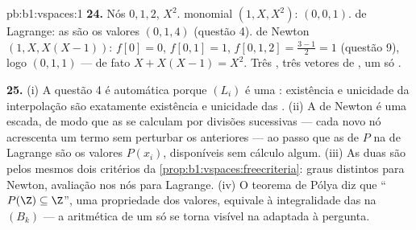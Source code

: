 \begin{solution}{pb:b1:vspaces:1}
\textbf{24.} Nós $0, 1, 2$,  $X^2$.  monomial
$(1, X, X^2)$:  $(0, 0, 1)$.  de Lagrange: as  são os
valores $(0, 1, 4)$ (questão 4).  de Newton $(1, X, X(X-1))$:  $f[0] = 0$, $f[0,1] = 1$, $f[0,1,2] = \frac{3 - 1}{2} = 1$ (questão 9), logo 
$(0, 1, 1)$ --- de fato $X + X(X-1) = X^2$. Três , três vetores de ,
um só .

\textbf{25.} (i) A questão 4 é automática porque $(L_i)$ é uma
\emph{}: existência e unicidade da interpolação são exatamente
existência e unicidade das . (ii) A  de Newton é uma
escada, de modo que as  se calculam por divisões
sucessivas --- cada novo nó acrescenta um termo sem perturbar os
anteriores --- ao passo que as  de $P$ na  de
Lagrange são os valores $P(x_i)$, disponíveis sem cálculo algum.
(iii) As duas  são  pelos mesmos dois critérios da
\cref{prop:b1:vspaces:freecriteria}: graus distintos para Newton, avaliação nos nós para
Lagrange. (iv) O teorema de Pólya diz que ``$P(\Z) \subseteq \Z$'', uma
propriedade dos valores, equivale à integralidade das 
na  $(B_k)$ --- a aritmética de um  só se torna
visível na  adaptada à pergunta.
\end{solution}
